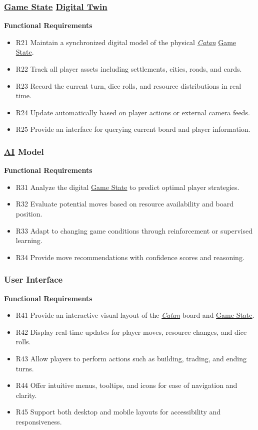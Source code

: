 \documentclass{article}
\newcommand{\Catan}{\href{https://en.wikipedia.org/wiki/Catan}{Catan}}
\newcommand{\AI}{\href{https://en.wikipedia.org/wiki/Artificial_intelligence}{AI}}
\newcommand{\DigitalTwin}{\href{https://en.wikipedia.org/wiki/Digital_twin}{Digital Twin}}
\newcommand{\GameState}{\href{https://milvus.io/ai-quick-reference/what-is-a-state-in-rl}{Game State}}
\begin{document}
\subsubsection{\GameState{} \DigitalTwin{}}

\textbf{Functional Requirements}

\begin{itemize}
  \item R21 Maintain a synchronized digital model of the physical \emph{\Catan{}} \GameState{}.
  \item R22 Track all player assets including settlements, cities, roads, and cards.
  \item R23 Record the current turn, dice rolls, and resource distributions in real time.
  \item R24 Update automatically based on player actions or external camera feeds.
  \item R25 Provide an interface for querying current board and player information.
\end{itemize}

\subsubsection{\AI{} Model}

\textbf{Functional Requirements}

\begin{itemize}
  \item R31 Analyze the digital \GameState{} to predict optimal player strategies.
  \item R32 Evaluate potential moves based on resource availability and board position.
  \item R33 Adapt to changing game conditions through reinforcement or supervised learning.
  \item R34 Provide move recommendations with confidence scores and reasoning.
\end{itemize}

\subsubsection{User Interface}

\textbf{Functional Requirements}

\begin{itemize}
  \item R41 Provide an interactive visual layout of the \emph{\Catan{}} board and \GameState{}.
  \item R42 Display real-time updates for player moves, resource changes, and dice rolls.
  \item R43 Allow players to perform actions such as building, trading, and ending turns.
  \item R44 Offer intuitive menus, tooltips, and icons for ease of navigation and clarity.
  \item R45 Support both desktop and mobile layouts for accessibility and responsiveness.

\end{itemize}
\end{document}

